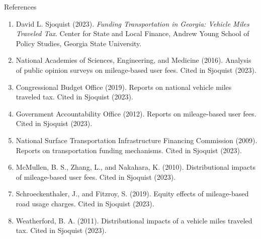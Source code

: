 \documentclass[aspectratio=169]{beamer}
\begin{document}
\begin{frame}{References}
\small
\begin{enumerate}
\item David L. Sjoquist (2023). \textit{Funding Transportation in Georgia: Vehicle Miles Traveled Tax}. Center for State and Local Finance, Andrew Young School of Policy Studies, Georgia State University.

\item National Academies of Sciences, Engineering, and Medicine (2016). Analysis of public opinion surveys on mileage-based user fees. Cited in Sjoquist (2023).

\item Congressional Budget Office (2019). Reports on national vehicle miles traveled tax. Cited in Sjoquist (2023).

\item Government Accountability Office (2012). Reports on mileage-based user fees. Cited in Sjoquist (2023).

\item National Surface Transportation Infrastructure Financing Commission (2009). Reports on transportation funding mechanisms. Cited in Sjoquist (2023).

\item McMullen, B. S., Zhang, L., and Nakahara, K. (2010). Distributional impacts of mileage-based user fees. Cited in Sjoquist (2023).

\item Schroeckenthaler, J., and Fitzroy, S. (2019). Equity effects of mileage-based road usage charges. Cited in Sjoquist (2023).

\item Weatherford, B. A. (2011). Distributional impacts of a vehicle miles traveled tax. Cited in Sjoquist (2023).
\end{enumerate}
\end{frame}
\end{document}
